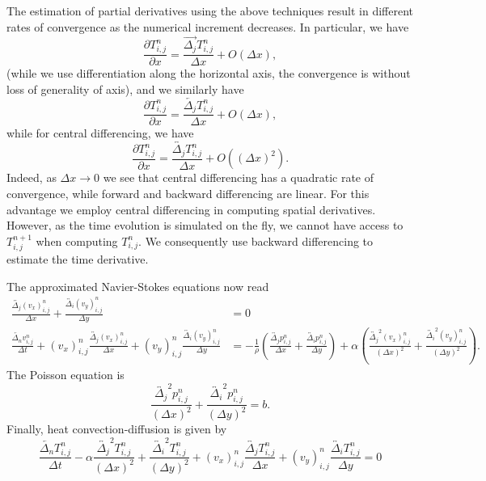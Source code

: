 \documentclass[12pt]{amsart}
\newcommand{\la}{\overleftarrow}
\newcommand{\ra}{\overrightarrow}
\newcommand{\ca}{\overleftrightarrow}
\begin{document}
The estimation of partial derivatives using the above techniques result in
different rates of convergence as the numerical increment decreases. In
particular, we have
\begin{equation}
    \frac{\partial T_{i,j}^n}{\partial x} = \frac{\ra{\Delta_j}T_{i,j}^n}{\Delta
    x}+ O(\Delta x),
    \label{eq:\theequation}
\end{equation}
(while we use differentiation along the horizontal axis, the
convergence is without loss of generality of axis), and we similarly have
\begin{equation}
    \frac{\partial T_{i,j}^n}{\partial x} = \frac{\la{\Delta_j}T_{i,j}^n}{\Delta
    x} + O(\Delta x),
    \label{eq:\theequation}
\end{equation}
while for central differencing, we have
\begin{equation}
     \frac{\partial T_{i,j}^n}{\partial x} = \frac{\ca{\Delta_j}T_{i,j}^n}{\Delta
    x} + O((\Delta x)^2).
    \label{eq:\theequation}
\end{equation}
Indeed, as $\Delta x \to 0$ we see that central differencing has a quadratic
rate of convergence, while forward and backward differencing are linear. For
this advantage we employ central differencing in computing spatial derivatives.
However, as the time evolution is simulated on the fly, we cannot have access to
$T_{i,j}^{n+1}$ when computing $T_{i,j}^n$. We consequently use backward
differencing to estimate the time derivative.

The approximated Navier-Stokes equations now read
\begin{align}
    \frac{\ca{\Delta_{j}}(v_x)_{i,j}^n}{\Delta x} +
    \frac{\ca{\Delta_{i}}(v_y)_{i,j}^n}{\Delta y} &= 0 \\
    \frac{\la{\Delta_n}v^{n}_{i,j}}{\Delta t} + (v_x)_{i,j}^{n}
    \frac{\ca{\Delta_{j}}(v_x)_{i,j}^n}{\Delta x} + (v_y)_{i,j}^n
    \frac{\ca{\Delta_{i}}(v_y)_{i,j}^n}{\Delta y} &=
    -\frac{1}{\rho} \left(  \frac{\ca{\Delta_j}p_{i,j}^n}{\Delta
    x}+\frac{\ca{\Delta_i}p_{i,j}^n}{\Delta y}  \right) + \alpha
    \left(\frac{\ca{\Delta_{j}}^2(v_x)_{i,j}^n}{(\Delta x)^2} + 
    \frac{\ca{\Delta_{i}}^2(v_y)_{i,j}^n}{(\Delta y)^2}
    \right).
\end{align}
The Poisson equation is 
\begin{equation}
    \frac{\ca{\Delta_{j}}^2p_{i,j}^n}{(\Delta x)^2} + 
    \frac{\ca{\Delta_{i}}^2p_{i,j}^n}{(\Delta y)^2}
    = b.
    \label{eq:\theequation}
\end{equation}
Finally, heat convection-diffusion is given by
\begin{equation}
    \frac{\la{\Delta_n}T_{i,j}^n}{\Delta t} - \alpha \frac{\ca{\Delta_{j}}^2T_{i,j}^n}{(\Delta x)^2} + 
    \frac{\ca{\Delta_{i}}^2T_{i,j}^n}{(\Delta y)^2} + (v_x)_{i,j}^n
    \frac{\ca{\Delta_{j}}T_{i,j}^n}{\Delta x} + (v_y)_{i,j}^n
    \frac{\ca{\Delta_{i}}T_{i,j}^n}{\Delta y} = 0
    \label{eq:\theequation}
\end{equation}
\end{document}
